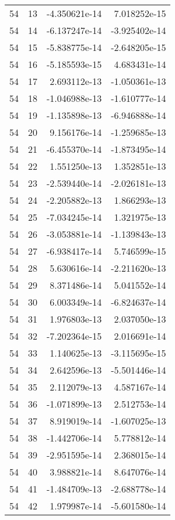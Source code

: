 \begin{tabular}{rrrr}
  54 &   13 & -4.350621e-14 &  7.018252e-15 \\
  54 &   14 & -6.137247e-14 & -3.925402e-14 \\
  54 &   15 & -5.838775e-14 & -2.648205e-15 \\
  54 &   16 & -5.185593e-15 &  4.683431e-14 \\
  54 &   17 &  2.693112e-13 & -1.050361e-13 \\
  54 &   18 & -1.046988e-13 & -1.610777e-14 \\
  54 &   19 & -1.135898e-13 & -6.946888e-14 \\
  54 &   20 &  9.156176e-14 & -1.259685e-13 \\
  54 &   21 & -6.455370e-14 & -1.873495e-14 \\
  54 &   22 &  1.551250e-13 &  1.352851e-13 \\
  54 &   23 & -2.539440e-14 & -2.026181e-13 \\
  54 &   24 & -2.205882e-13 &  1.866293e-13 \\
  54 &   25 & -7.034245e-14 &  1.321975e-13 \\
  54 &   26 & -3.053881e-14 & -1.139843e-13 \\
  54 &   27 & -6.938417e-14 &  5.746599e-15 \\
  54 &   28 &  5.630616e-14 & -2.211620e-13 \\
  54 &   29 &  8.371486e-14 &  5.041552e-14 \\
  54 &   30 &  6.003349e-14 & -6.824637e-14 \\
  54 &   31 &  1.976803e-13 &  2.037050e-13 \\
  54 &   32 & -7.202364e-15 &  2.016691e-14 \\
  54 &   33 &  1.140625e-13 & -3.115695e-15 \\
  54 &   34 &  2.642596e-13 & -5.501446e-14 \\
  54 &   35 &  2.112079e-13 &  4.587167e-14 \\
  54 &   36 & -1.071899e-13 &  2.512753e-14 \\
  54 &   37 &  8.919019e-14 & -1.607025e-13 \\
  54 &   38 & -1.442706e-14 &  5.778812e-14 \\
  54 &   39 & -2.951595e-14 &  2.368015e-14 \\
  54 &   40 &  3.988821e-14 &  8.647076e-14 \\
  54 &   41 & -1.484709e-13 & -2.688778e-14 \\
  54 &   42 &  1.979987e-14 & -5.601580e-14 \\

\end{tabular}

